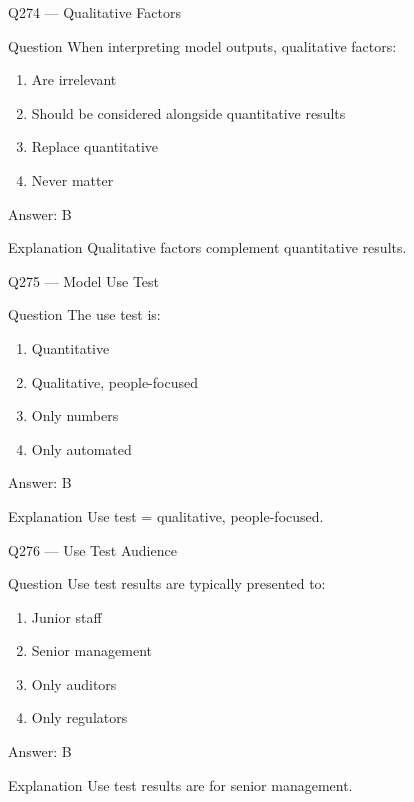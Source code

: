\documentclass[aspectratio=169,8pt]{beamer}
\begin{document}
\begin{frame}{Q274 --- Qualitative Factors}
\begin{block}{Question}
When interpreting model outputs, qualitative factors:
\begin{enumerate}
\item Are irrelevant
\item Should be considered alongside quantitative results
\item Replace quantitative
\item Never matter
\end{enumerate}
\end{block}
\begin{exampleblock}{Answer: B}\end{exampleblock}
\begin{block}{Explanation}
Qualitative factors complement quantitative results.
\end{block}
\end{frame}

\begin{frame}{Q275 --- Model Use Test}
\begin{block}{Question}
The use test is:
\begin{enumerate}
\item Quantitative
\item Qualitative, people-focused
\item Only numbers
\item Only automated
\end{enumerate}
\end{block}
\begin{exampleblock}{Answer: B}\end{exampleblock}
\begin{block}{Explanation}
Use test = qualitative, people-focused.
\end{block}
\end{frame}

\begin{frame}{Q276 --- Use Test Audience}
\begin{block}{Question}
Use test results are typically presented to:
\begin{enumerate}
\item Junior staff
\item Senior management
\item Only auditors
\item Only regulators
\end{enumerate}
\end{block}
\begin{exampleblock}{Answer: B}\end{exampleblock}
\begin{block}{Explanation}
Use test results are for senior management.
\end{block}
\end{frame}
\end{document}
